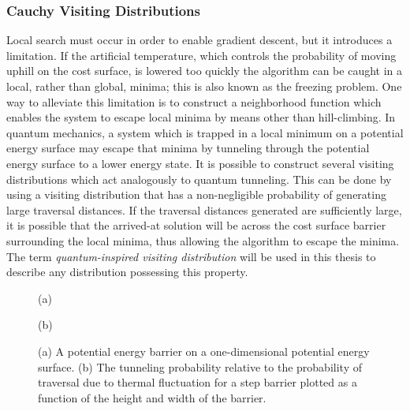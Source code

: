 \documentclass[11pt]{afthesis}
\begin{document}
	\subsubsection{Cauchy Visiting Distributions}
	\label{visiting_distribution_abstract_cauchy}
	
	Local search must occur in order to enable gradient descent, but it introduces a limitation. If the artificial temperature, which controls the probability of moving uphill on the cost surface, is lowered too quickly the algorithm can be caught in a local, rather than global, minima; this is also known as the freezing problem. One way to alleviate this limitation is to construct a neighborhood function which enables the system to escape local minima by means other than hill-climbing. In quantum mechanics, a system which is trapped in a local minimum on a potential energy surface may escape that minima by tunneling through the potential energy surface to a lower energy state. It is possible to construct several visiting distributions which act analogously to quantum tunneling. This can be done by using a visiting distribution that has a non-negligible probability of generating large traversal distances. If the traversal distances generated are sufficiently large, it is possible that the arrived-at solution will be across the cost surface barrier surrounding the local minima, thus allowing the algorithm to escape the minima. The term \textit{quantum-inspired visiting distribution} will be used in this thesis to describe any distribution possessing this property.
	
	\begin{figure}[ht!]
		
		\begin{minipage}[b]{0.48\linewidth}
			\centering
			\centerline{}
			\centerline{(a)}\medskip
		\end{minipage}
		\hfill
		\begin{minipage}[b]{0.48\linewidth}
			\centering
			\centerline{}
			\centerline{(b)}\medskip
		\end{minipage}
		\caption{
			(a) A potential energy barrier on a one-dimensional potential energy surface.
			(b) The tunneling probability relative to the probability of traversal due to thermal fluctuation for a step barrier plotted as a function of the height and width of the barrier.}
		\label{fig:quantum_advantage}
	\end{figure}
		
\end{document}

